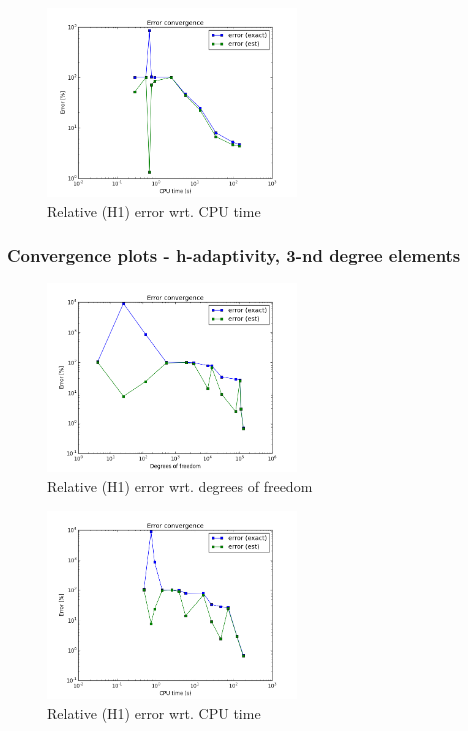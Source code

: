 			\begin{figure}[H]
				\centering
				\includegraphics[height=5cm]{img/sin100-h2-cpu.png}
				\caption{Relative (H1) error wrt. CPU time}
			\end{figure}
			
		\subsubsection{Convergence plots - h-adaptivity, 3-nd degree elements}
			\begin{figure}[H]
				\centering
				\includegraphics[height=5cm]{img/sin100-h3-dof.png}
				\caption{Relative (H1) error wrt. degrees of freedom}
			\end{figure}
			
			\begin{figure}[H]
				\centering
				\includegraphics[height=5cm]{img/sin100-h3-cpu.png}
				\caption{Relative (H1) error wrt. CPU time}
			\end{figure}
			

